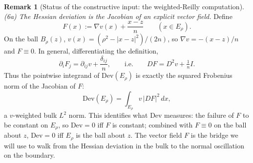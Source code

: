 \documentclass[11pt]{amsart}
\theoremstyle{definition}
\newtheorem{remark}[theorem]{Remark}
\begin{document}
\begin{remark}[Status of the constructive input: the weighted-Reilly computation]
\emph{(6a) The Hessian deviation is the Jacobian of an explicit vector field.}
Define
\[
   F(x):=\nabla v(x)+\frac{x-z}{n}\qquad(x\in E_\rho).
\]
On the ball \(B_\rho(z)\), \(v(x)=(\rho^2-|x-z|^2)/(2n)\), so
\(\nabla v=-(x-z)/n\) and \(F\equiv0\).  In general, differentiating the
definition,
\begin{equation}\label{eq:F-jacobian}
   \partial_iF_j=\partial_{ij}v+\frac{\delta_{ij}}{n},
   \qquad\text{i.e.}\qquad
   DF=D^2v+\tfrac1n I .
\end{equation}
Thus the pointwise integrand of \(\mathrm{Dev}(E_\rho)\) is exactly the squared
Frobenius norm of the Jacobian of \(F\):
\[
   \mathrm{Dev}(E_\rho)=\int_{E_\rho}v\,|DF|^2\,dx ,
\]
a \(v\)-weighted bulk \(L^2\) norm.  This identifies what \(\mathrm{Dev}\)
measures: the failure of \(F\) to be constant on \(E_\rho\), so
\(\mathrm{Dev}=0\) iff \(F\) is constant; combined with \(F\equiv0\) on the ball
about \(z\), \(\mathrm{Dev}=0\) iff \(E_\rho\) is the ball about \(z\).  The
vector field \(F\) is the bridge we will use to walk from the Hessian deviation
in the bulk to the normal oscillation on the boundary.


\end{remark}
\end{document}
